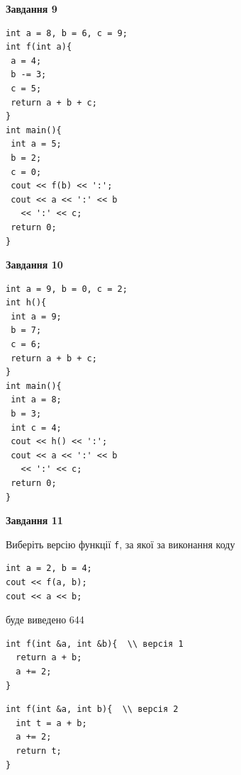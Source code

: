 \documentclass[12pt, ukrainian]{article}
\def\code#1{\Verb!#1!}
\begin{document}
{\begin {large}
\begin{minipage}[t]{11.0cm}
\end{minipage}


\begin{minipage}[t]{7.0cm}

\begin{center}
\textbf{Завдання 9}
\end{center}
\vspace{-8mm}

\begin{verbatim}
int a = 8, b = 6, c = 9;
int f(int a){
 a = 4;
 b -= 3;
 c = 5;
 return a + b + c;
}
int main(){
 int a = 5;
 b = 2;
 c = 0;
 cout << f(b) << ':';
 cout << a << ':' << b 
   << ':' << c;
 return 0;
}
\end{verbatim}



\begin{center}
\textbf{Завдання 10}
\end{center}
\vspace{-8mm}

\begin{verbatim}
int a = 9, b = 0, c = 2;
int h(){
 int a = 9;
 b = 7;
 c = 6;
 return a + b + c;
}
int main(){
 int a = 8;
 b = 3;
 int c = 4;
 cout << h() << ':';
 cout << a << ':' << b 
   << ':' << c;
 return 0;
}
\end{verbatim}

\end{minipage}
\vline \hspace{1mm}
\begin{minipage}[t]{11.0cm}

\begin{center}
\textbf{Завдання 11}
\end{center}
Виберіть версію функції \code{f}, за якої за виконання коду
\begin{verbatim}
int a = 2, b = 4;
cout << f(a, b);
cout << a << b;
\end{verbatim}

буде виведено 644

\begin{verbatim}
int f(int &a, int &b){  \\ версія 1
  return a + b;
  a += 2;
}
\end{verbatim}

\vspace{-8mm}\begin{verbatim}
int f(int &a, int b){  \\ версія 2
  int t = a + b;
  a += 2;
  return t;
}
\end{verbatim}


\end{minipage}
\end{large}}
\end{document}

